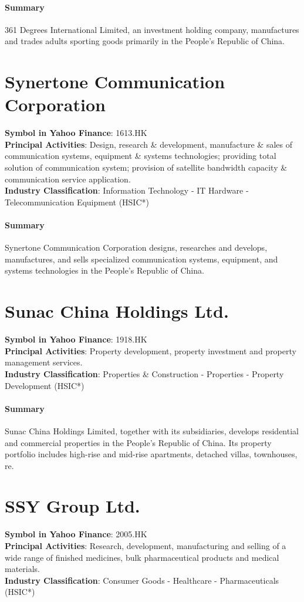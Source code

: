 \paragraph{Summary}
361 Degrees International Limited, an investment holding company, manufactures and trades adults sporting goods primarily in the People's Republic of China.


\section{Synertone Communication Corporation}
\textbf{Symbol in Yahoo Finance}: 1613.HK\\
\textbf{Principal Activities}: Design, research \& development, manufacture \& sales of communication systems, equipment \& systems technologies; providing total solution of communication system; provision of satellite bandwidth capacity \& communication service application.\\
\textbf{Industry Classification}: Information Technology - IT Hardware - Telecommunication Equipment (HSIC*)
\paragraph{Summary}
Synertone Communication Corporation designs, researches and develops, manufactures, and sells specialized communication systems, equipment, and systems technologies in the People's Republic of China.


\section{Sunac China Holdings Ltd.}
\textbf{Symbol in Yahoo Finance}: 1918.HK\\
\textbf{Principal Activities}: Property development, property investment and property management services.\\
\textbf{Industry Classification}: Properties \& Construction - Properties - Property Development (HSIC*)
\paragraph{Summary}
Sunac China Holdings Limited, together with its subsidiaries, develops residential and commercial properties in the People's Republic of China. Its property portfolio includes high-rise and mid-rise apartments, detached villas, townhouses, re.


\section{SSY Group Ltd.}
\textbf{Symbol in Yahoo Finance}: 2005.HK\\
\textbf{Principal Activities}: Research, development, manufacturing and selling of a wide range of finished medicines, bulk pharmaceutical products and medical materials.\\
\textbf{Industry Classification}: Consumer Goods - Healthcare - Pharmaceuticals (HSIC*)
